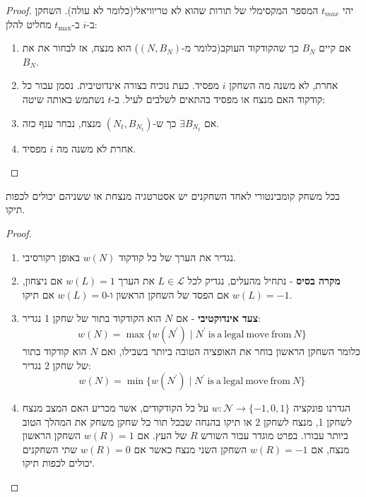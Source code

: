 \documentclass{tstextbook}
\begin{document}
\begin{proof}
יהי \(t_{max}\) המספר המקסימלי של תורות שהוא לא טריוויאלי(כלומר לא עולה).
השחקן ב-\(i\) ב-\(t_{\max}\) מחליט להלן:

  \begin{enumerate}
    \item אם קיים \(B_{N}\) כך שהקודקוד העוקב(כלומר מ-\((N,B_{N})\)) הוא מנצח, אז לבחור את את \(B_{N}\). 


    \item אחרת, לא משנה מה השחקן \(i\) מפסיד. 
כעת נוכיח בצורה אינדוטיבית. נסמן עבור כל קודקוד האם מנצח או מפסיד בהתאים לשלבים לעיל. ב-\(t\) נשתמש באותה שיטה:


    \item אם \(\exists B_{N_{t}}\) כך ש-\((N_{t},B_{N_{t}})\) מנצח, נבחר ענף כזה. 


    \item אחרת לא משנה מה \(i\) מפסיד. 


  \end{enumerate}
\end{proof}
\begin{proposition}
בכל משחק קומבינטורי לאחד השחקנים יש אסטרטגיה מנצחת או ששניהם יכולים לכפות תיקו.

\end{proposition}
\begin{proof}
  \begin{enumerate}
    \item נגדיר את הערך של כל קודקוד \(w(N)\) באופן רקורסיבי. 


    \item \textbf{מקרה בסיס} - נתחיל מהעלים, נגדיק לכל \(L\in \mathcal{L}\) את הערך \(w(L)=1\) אם ניצחון, \(w(L)=-1\) אם הפסד של השחקן הראשון ו-\(w(L)=0\) אם תיקו. 


    \item \textbf{צעד אינדוקטיבי} - אם \(N\) הוא הקודקוד בתור של שחקן 1 נגדיר: 
$$w(N)=\operatorname*{max}\{w(N^{\prime})\mid N^{\prime}{\mathrm{~is~a~legal~move~from~}}N\}$$
כלומר השחקן הראשון בוחר את האופציה הטובה ביותר בשבילו, ואם \(N\) הוא קודקוד בתור של שחקן 2 נגדיר:
$$w(N)=\operatorname*{min}\{w(N^{\prime})\mid N^{\prime}{\mathrm{~is~a~legal~move~from~}}N\}$$


    \item הגדרנו פונקציה \(w:\mathcal{N}\to\{ -1,0,1 \}\) על כל הקודקודים, אשר מכריע האם המצב מנצח לשחקן 1, מנצח לשחקן 2 או תיקו בהנחה שבכל תור כל שחקן משחק את המהלך הטוב ביותר עבורו. בפרט מוגדר עבור השורש \(R\) של העץ. אם \(w(R)=1\) השחקן הראשון מנצח, אם \(w(R)=-1\) השחקן השני מנצח כאשר אם \(w(R)=0\) שתי השחקנים יכולים לכפות תיקו. 


  \end{enumerate}
\end{proof}
\end{document}
